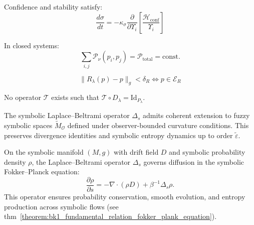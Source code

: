 \begin{axiom}
\label{axiom:bk6_confidence_stability_coupling}
Confidence and stability satisfy:
\begin{equation}
\frac{d\sigma}{dt} = -\kappa_\sigma \frac{\partial}{\partial \Upsilon_i}\left[\frac{\mathcal{H}_{\text{conf}}}{\Upsilon_i}\right]
\end{equation}
\end{axiom}

\begin{axiom}
\label{axiom:bk6_power_conservation}
In closed systems:
\begin{equation}
\sum_{i,j} \mathcal{P}_\nu(p_i, p_j) = \mathcal{P}_{\text{total}} = \text{const.}
\end{equation}
\end{axiom}

\begin{axiom}
\label{axiom:bk6_reflective_coherence_complete}
\begin{equation}
\|R_\lambda(p) - p\|_g < \delta_R \iff p \in \mathcal{E}_R
\end{equation}
\end{axiom}

\begin{axiom}
\label{axiom:bk6_symbolic_time_irreversibility_complete}
No operator $\mathcal{T}$ exists such that $\mathcal{T} \circ D_\lambda = \text{Id}_{P_{\lambda}}$.
\end{axiom}

\begin{axiom}
\label{axiom:bk6_laplace_beltrami_observer_extension}
The symbolic Laplace–Beltrami operator $\Delta_s$ admits coherent extension to fuzzy symbolic spaces $\tilde{M}_\mathcal{O}$ defined under observer-bounded curvature conditions. This preserves divergence identities and symbolic entropy dynamics up to order $\tilde{\varepsilon}$.
\end{axiom}

\begin{theorem}
\label{theorem:bk6_symbolic_diffusion_governs_evolution}
On the symbolic manifold $(M, g)$ with drift field $D$ and symbolic probability density $\rho$, the Laplace–Beltrami operator $\Delta_s$ governs diffusion in the symbolic Fokker–Planck equation:
\[
\frac{\partial \rho}{\partial s} = -\nabla \cdot (\rho D) + \beta^{-1} \Delta_s \rho.
\]
This operator ensures probability conservation, smooth evolution, and entropy production across symbolic flows (see thm~\ref{theorem:bk1_fundamental_relation_fokker_plank_equation}).
\end{theorem}

